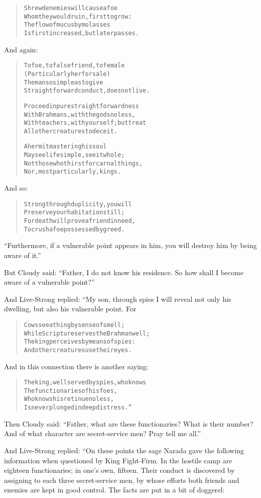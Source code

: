 \documentclass[article, twoside, 10pt]{memoir}
\renewenvironment{verbatim}{%
\begin{quote}%
\vskip -10pt%
\begin{alltt}\normalfont\small}{\end{alltt}%
\end{quote}%
\vskip -10pt
} %
\begin{document}
\begin{verbatim}
Shrewd enemies will cause a foe
Whom they would ruin, first to grow:
The flow of mucus by molasses
Is first increased, but later passes.
\end{verbatim}
And again:

\begin{verbatim}
To foe, to false friend, to female
(Particularly her for sale)
The man so simple as to give
Straightforward conduct, does not live.

Proceed in pure straightforwardness
With Brahmans, with the gods no less,
With teachers, with yourself; but treat
All other creatures to deceit.

A hermit mastering his soul
May see life simple, see it whole;
Not those who thirst for carnal things,
Nor, most particularly, kings.
\end{verbatim}
And so:

\begin{verbatim}
Strong through duplicity, you will
Preserve your habitation still;
For death will prove a friend in need,
To crush a foe possessed by greed.
\end{verbatim}
``Furthermore, if a vulnerable point appears in him, you will destroy him by being aware of it.''

But Cloudy said:
``Father, I do not know his residence. So how shall I become aware of a vulnerable point?''

And Live-Strong replied: “My son, through spies I will reveal not
only his dwelling, but also his vulnerable point. For

\begin{verbatim}
Cows see a thing by sense of smell;
While Scripture serves the Brahman well;
The king perceives by means of spies:
And other creatures use their eyes.
\end{verbatim}
And in this connection there is another saying:

\begin{verbatim}
The king, well served by spies, who knows
The functionaries of his foes,
Who knows his retinue no less,
Is never plunged in deep distress.”
\end{verbatim}
Then Cloudy said:
``Father, what are these functionaries? What is their number? And of what character are secret-service men? Pray tell me all.''

And Live-Strong replied: “On these points the sage Narada gave the
following information when questioned by King Fight-Firm. In the
hostile camp are eighteen functionaries; in one's own, fifteen.
Their conduct is discovered by assigning to each three
secret-service men, by whose efforts both friends and enemies are
kept in good control. The facts are put in a bit of doggerel:
\end{document}

